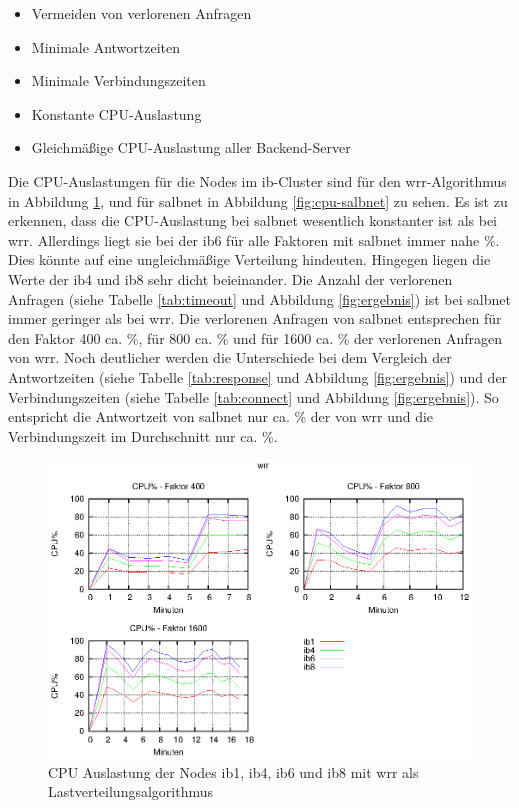 \documentclass[a4paper, 12pt, BCOR10mm, DIV12, toc=bibliography, toc=listof, german]{scrbook}
\begin{document}
			\begin{itemize}
				\item Vermeiden von verlorenen Anfragen
				\item Minimale Antwortzeiten
				\item Minimale Verbindungszeiten
				\item Konstante CPU-Auslastung
				\item Gleichmäßige CPU-Auslastung aller Backend-Server
			\end{itemize}

			Die CPU-Auslastungen für die Nodes im ib-Cluster sind für den wrr-Algorithmus in Abbildung
			\ref{fig:cpu-wrr}, und für salbnet in Abbildung \ref{fig:cpu-salbnet} zu sehen. Es ist zu
			erkennen, dass die CPU-Auslastung bei salbnet wesentlich konstanter ist als bei wrr.
			Allerdings liegt sie bei der ib6 für alle Faktoren mit salbnet immer nahe \unit[100]{\%}. Dies könnte
			auf eine ungleichmäßige Verteilung hindeuten. Hingegen liegen die Werte der ib4 und ib8 sehr
			dicht beieinander. Die Anzahl der verlorenen Anfragen (siehe Tabelle \ref{tab:timeout} und
			Abbildung \ref{fig:ergebnis}) ist bei salbnet immer geringer als bei wrr.  Die verlorenen
			Anfragen von salbnet entsprechen für den Faktor 400 ca. \unit[25]{\%}, für 800 ca. \unit[33]{\%} und für 1600
			ca. \unit[50]{\%} der verlorenen Anfragen von wrr. Noch deutlicher werden die Unterschiede bei dem
			Vergleich der
			Antwortzeiten (siehe Tabelle \ref{tab:response} und Abbildung \ref{fig:ergebnis}) und der
			Verbindungszeiten  (siehe Tabelle \ref{tab:connect} und Abbildung \ref{fig:ergebnis}).
			So entspricht die Antwortzeit von salbnet nur ca. \unit[15]{\%} der von wrr und die Verbindungszeit im
			Durchschnitt nur ca. \unit[30]{\%}.

			\begin{figure}
				\centering
				\includegraphics[width=13cm]{plots/cpu-wrr}
				\caption{CPU Auslastung der Nodes ib1, ib4, ib6 und ib8 mit wrr als
				Lastverteilungsalgorithmus}
				\label{fig:cpu-wrr}
			\end{figure}
\end{document}
